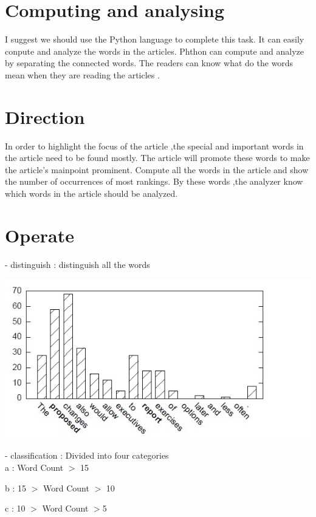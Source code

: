\section*{Computing and analysing}
I suggest we should use the Python language to complete this task. 
It can easily conpute and analyze the words in the articles.
Phthon can compute and analyze by separating the connected words.
The readers can know what do the words mean when they are reading the articles .

\section*{Direction}


In order to highlight the focus of the article ,the special and important words in the article need to be found mostly.
The article will promote these words to make the article's mainpoint prominent.
Compute all the words in the article and show the number of occurrences of most rankings.
By these words ,the analyzer know which words in the article should be analyzed.


\section*{Operate}
\label{sec:meth}
- distinguish     : distinguish all the words \\
\begin{center}
	\includegraphics[width=\columnwidth]{union_01.jpg}
\end{center}
- classification   : Divided into four categories \\


a : Word Count $>$ 15 

b : 15 $>$ Word Count $>$ 10

c : 10 $>$ Word Count $>$5 

